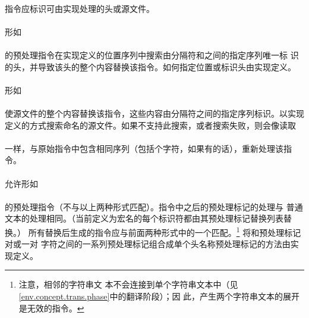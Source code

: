 
\constraint
\paragraph{}
指令应标识可由实现处理的头或源文件。

\semantic
\paragraph{}
形如                                                                          \\
\mbox{\hspace{4em}\tm{>} }  \\
的预处理指令在实现定义的位置序列中搜索由分隔符\tm{<}和\tm{>}之间的指定序列唯一标
识的头，并导致该头的整个内容替换该指令。如何指定位置或标识头由实现定义。

\paragraph{}
形如                                                                          \\
\mbox{\hspace{4em}\tm{\dq}
  }                                                              \\
使源文件的整个内容替换该指令，这些内容由分隔符\tm{\dq}之间的指定序列标识。以实现
定义的方式搜索命名的源文件。如果不支持此搜索，或者搜索失败，则会像读取        \\
\mbox{\hspace{4em}\tm{>} }  \\
一样，与原始指令中包含相同序列（包括\tm{>}个字符，如果有的话），重新处理该指令。

\paragraph{}
允许形如                                                                      \\
\mbox{\hspace{4em} }                    \\
的预处理指令（不与以上两种形式匹配）。指令中之后的预处理标记的处理与
普通文本的处理相同。（当前定义为宏名的每个标识符都由其预处理标记替换列表替换。）
所有替换后生成的指令应与前面两种形式中的一个匹配。\footnote{注意，相邻的字符串文
本不会连接到单个字符串文本中（见\ref{env.concept.trans.phase}中的翻译阶段）；因
此，产生两个字符串文本的展开是无效的指令。} 将\tm{<}和\tm{>}预处理标记对或一对
\tm{\dq}字符之间的一系列预处理标记组合成单个头名称预处理标记的方法由实现定义。

